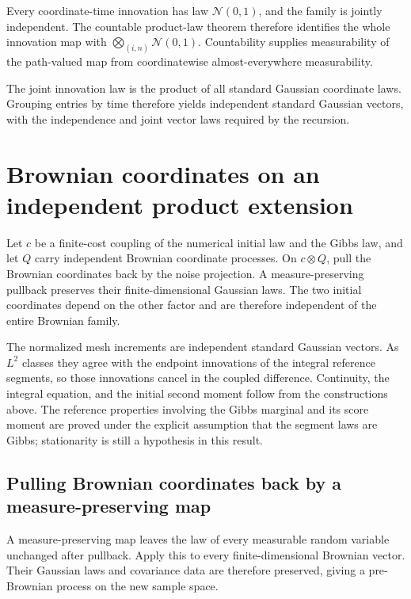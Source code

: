 \documentclass[11pt,a4paper]{report}
\begin{document}
Every coordinate-time innovation has law \(\mathcal N(0,1)\), and the family is jointly independent. The countable product-law theorem therefore identifies the whole innovation map with \(\bigotimes_{(i,n)}\mathcal N(0,1)\). Countability supplies measurability of the path-valued map from coordinatewise almost-everywhere measurability.



The joint innovation law is the product of all standard Gaussian coordinate laws. Grouping entries by time therefore yields independent standard Gaussian vectors, with the independence and joint vector laws required by the recursion.

\section{\texorpdfstring{Brownian coordinates on an independent product extension}{Brownian coordinates on an independent product extension}}
\label{proof-module-UnadjustedLangevin-ProductBrownian-lean}


Let \(c\) be a finite-cost coupling of the numerical initial law and the Gibbs law, and let \(Q\) carry independent Brownian coordinate processes. On \(c\otimes Q\), pull the Brownian coordinates back by the noise projection. A measure-preserving pullback preserves their finite-dimensional Gaussian laws. The two initial coordinates depend on the other factor and are therefore independent of the entire Brownian family.



The normalized mesh increments are independent standard Gaussian vectors. As \(L^2\) classes they agree with the endpoint innovations of the integral reference segments, so those innovations cancel in the coupled difference. Continuity, the integral equation, and the initial second moment follow from the constructions above. The reference properties involving the Gibbs marginal and its score moment are proved under the explicit assumption that the segment laws are Gibbs; stationarity is still a hypothesis in this result.

\subsection{\texorpdfstring{Pulling Brownian coordinates back by a measure-preserving map}{Pulling Brownian coordinates back by a measure-preserving map}}
\label{report-step-UnadjustedLangevin-ProductBrownian-lean-1}


A measure-preserving map leaves the law of every measurable random variable unchanged after pullback. Apply this to every finite-dimensional Brownian vector. Their Gaussian laws and covariance data are therefore preserved, giving a pre-Brownian process on the new sample space.
\end{document}

